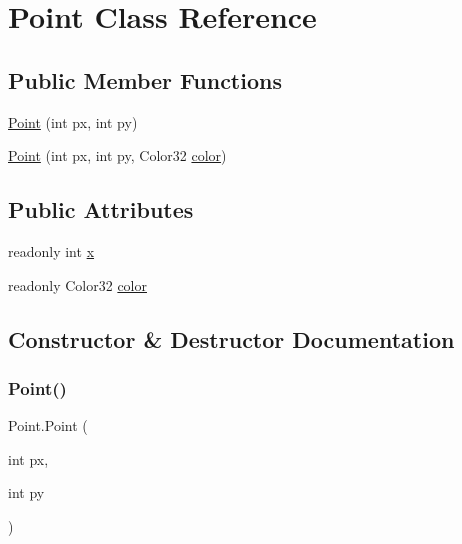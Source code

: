 \hypertarget{class_point}{}\section{Point Class Reference}
\label{class_point}
\subsection*{Public Member Functions}
\begin{DoxyCompactItemize}
\item 
\mbox{\hyperlink{class_point_a932c5d40861535691b878b2633222f6d}{Point}} (int px, int py)
\item 
\mbox{\hyperlink{class_point_ad0f26f031c620d65f52cc10baf5cb0f0}{Point}} (int px, int py, Color32 \mbox{\hyperlink{class_point_a353867b30168d06c7736f33dad034d89}{color}})
\end{DoxyCompactItemize}
\subsection*{Public Attributes}
\begin{DoxyCompactItemize}
\item 
readonly int \mbox{\hyperlink{class_point_af9fd50a73619d705a638fcbb017f241f}{x}}
\item 
readonly Color32 \mbox{\hyperlink{class_point_a353867b30168d06c7736f33dad034d89}{color}}
\end{DoxyCompactItemize}


\subsection{Constructor \& Destructor Documentation}
\mbox{\label{class_point_a932c5d40861535691b878b2633222f6d}} 
\subsubsection{\texorpdfstring{Point()}{Point()}\hspace{0.1cm}{\footnotesize\ttfamily [1/2]}}
{\footnotesize\ttfamily Point.\+Point (\begin{DoxyParamCaption}\item[{int}]{px,  }\item[{int}]{py }\end{DoxyParamCaption})}

\mbox{\label{class_point_ad0f26f031c620d65f52cc10baf5cb0f0}} 
